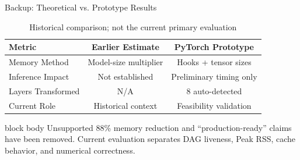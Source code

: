 \documentclass[10pt,aspectratio=169]{beamer}
\begin{document}
\begin{frame}{Backup: Theoretical vs. Prototype Results}
\begin{table}
\centering
\caption{Historical comparison; not the current primary evaluation}
\small
\begin{tabular}{l c c}
\toprule
\textbf{Metric} & \textbf{Earlier Estimate} & \textbf{PyTorch Prototype} \\
\midrule
Memory Method & Model-size multiplier & Hooks + tensor sizes \\
Inference Impact & Not established & Preliminary timing only \\
Layers Transformed & N/A & 8 auto-detected \\
Current Role & Historical context & Feasibility validation \\
\bottomrule
\end{tabular}
\end{table}

\begin{beamercolorbox}[sep=0.35em,center,rounded=true,shadow=true]{block body}
\small
Unsupported 88\% memory reduction and ``production-ready'' claims have been removed. Current evaluation separates DAG liveness, Peak RSS, cache behavior, and numerical correctness.
\end{beamercolorbox}
\end{frame}
\end{document}
